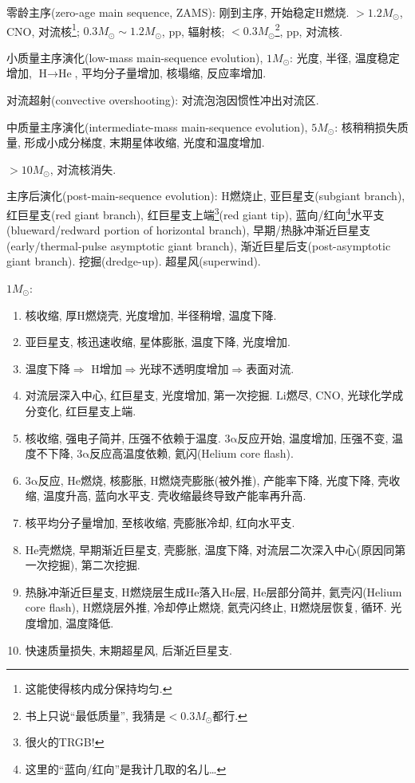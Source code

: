 零龄主序(zero-age main sequence, ZAMS): 刚到主序, 开始稳定$\text{H}$燃烧. $>1.2M_\odot$, CNO, 对流核\footnote{这能使得核内成分保持均匀.}; $0.3M_\odot\sim1.2M_\odot$, pp, 辐射核; $<0.3M_\odot$\footnote{书上只说``最低质量'', 我猜是$<0.3M_\odot$都行.}, pp, 对流核.

小质量主序演化(low-mass main-sequence evolution), $1M_\odot$: 光度, 半径, 温度稳定增加, $\text{H}\to\text{He}$, 平均分子量增加, 核塌缩, 反应率增加.

对流超射(convective overshooting): 对流泡泡因惯性冲出对流区.

中质量主序演化(intermediate-mass main-sequence evolution), $5M_\odot$: 核稍稍损失质量, 形成小成分梯度, 末期星体收缩, 光度和温度增加.

$>10M_\odot$, 对流核消失.

主序后演化(post-main-sequence evolution): $\text{H}$燃烧止, 亚巨星支(subgiant branch), 红巨星支(red giant branch), 红巨星支上端\footnote{很火的TRGB!}(red giant tip), 蓝向/红向\footnote{这里的``蓝向/红向''是我计几取的名儿\dots}水平支(blueward/redward portion of horizontal branch), 早期/热脉冲渐近巨星支(early/thermal-pulse asymptotic giant branch), 渐近巨星后支(post-asymptotic giant branch). 挖掘(dredge-up). 超星风(superwind).

$1M_\odot$:
\begin{enumerate}
    \item 核收缩, 厚$\text{H}$燃烧壳, 光度增加, 半径稍增, 温度下降.
    \item 亚巨星支, 核迅速收缩, 星体膨胀, 温度下降, 光度增加.
    \item 温度下降$\Longrightarrow$ $\text{H}$增加$\Longrightarrow$光球不透明度增加$\Longrightarrow$表面对流. 
    \item 对流层深入中心, 红巨星支, 光度增加, 第一次挖掘. $\text{Li}$燃尽, CNO, 光球化学成分变化, 红巨星支上端.
    \item 核收缩, 强电子简并, 压强不依赖于温度. 3$\mathrm{\alpha}$反应开始, 温度增加, 压强不变, 温度不下降,  3$\mathrm{\alpha}$反应高温度依赖, 氦闪(Helium core flash).
    \item 3$\mathrm{\alpha}$反应, $\text{He}$燃烧, 核膨胀, $\text{H}$燃烧壳膨胀(被外推), 产能率下降, 光度下降, 壳收缩, 温度升高, 蓝向水平支. 壳收缩最终导致产能率再升高.
    \item 核平均分子量增加, 至核收缩, 壳膨胀冷却, 红向水平支.
    \item $\text{He}$壳燃烧, 早期渐近巨星支, 壳膨胀, 温度下降, 对流层二次深入中心(原因同第一次挖掘), 第二次挖掘.
    \item 热脉冲渐近巨星支, $\text{H}$燃烧层生成$\text{He}$落入$\text{He}$层, $\text{He}$层部分简并, 氦壳闪(Helium core flash), $\text{H}$燃烧层外推, 冷却停止燃烧, 氦壳闪终止, $\text{H}$燃烧层恢复, 循环. 光度增加, 温度降低.
    \item 快速质量损失, 末期超星风, 后渐近巨星支.
\end{enumerate}


